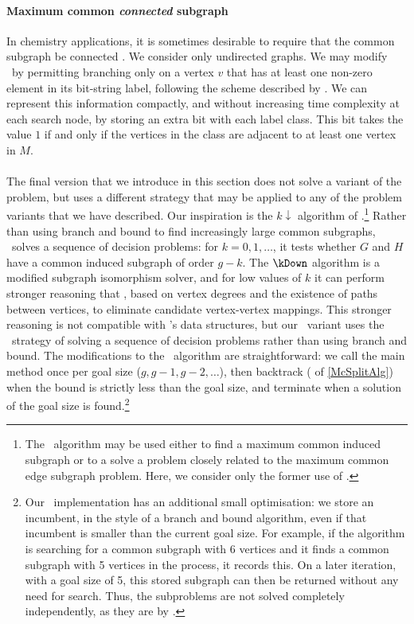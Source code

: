 \paragraph{Maximum common \emph{connected} subgraph} In chemistry applications,
it is sometimes desirable to require that the common subgraph be connected
\citep{Ehrlich:2011}. We consider only undirected graphs. We may modify \McSplit\ by
permitting branching only on a vertex $v$ that has at least one non-zero
element in its bit-string label, following the scheme described by
\citet{DBLP:conf/mco/VismaraV08}.  We can represent this information compactly,
and without increasing time complexity at each search node, by storing an extra
bit with each label class.  This bit takes the value $1$ if and only if the
vertices in the class are adjacent to at least one vertex in $M$.

\paragraph{\McSplitDown} The final version that we introduce in this section
does not solve a variant of the problem, but uses a different strategy
that may be applied to any of the problem variants that we have described.
Our inspiration is the $k{\downarrow}$ algorithm of
\citet{UpcomingAAAIPaper}.\footnote{The \kDown\ algorithm may be used
either to find a maximum common induced subgraph or to a solve a problem
closely related to the maximum common edge subgraph problem.  Here, we consider
only the former use of \kDown.}  Rather than using branch and bound to find
increasingly large common subgraphs, \kDown\ solves a sequence of decision problems:
for $k=0, 1, \dots$, it tests whether $G$ and $H$ have a common induced subgraph
of order $g-k$.  The $\kDown$ algorithm is a modified subgraph isomorphism solver,
and for low values of $k$ it can perform stronger reasoning that \McSplit,
based on vertex degrees and the existence of paths between vertices, to eliminate
candidate vertex-vertex mappings.  This stronger reasoning is not compatible
with \McSplit's data structures, but our \McSplitDown\ variant uses the \kDown\
strategy of solving a sequence of decision problems rather than using branch
and bound.
The modifications to the \McSplit\ algorithm are straightforward:
we call the main \FuncSty{McSplit} method once per goal size ($g, g-1, g-2,
\dots$), then backtrack (\lineref{PruneSearch} of \cref{McSplitAlg}) when the
bound is strictly less than the goal size, and terminate when a solution of the
goal size is found.\footnote{Our \McSplit\ implementation has an additional
small optimisation: we store an incumbent, in the style of a branch and bound
algorithm, even if that incumbent is smaller than the current goal size.
For example, if the algorithm is searching for a common subgraph with 6 vertices
and it finds a common subgraph with 5 vertices in the process, it records this.
On a later iteration, with a goal size of 5, this stored subgraph can then
be returned without any need for search.  Thus, the subproblems are not
solved completely independently, as they are by \kDown.}

